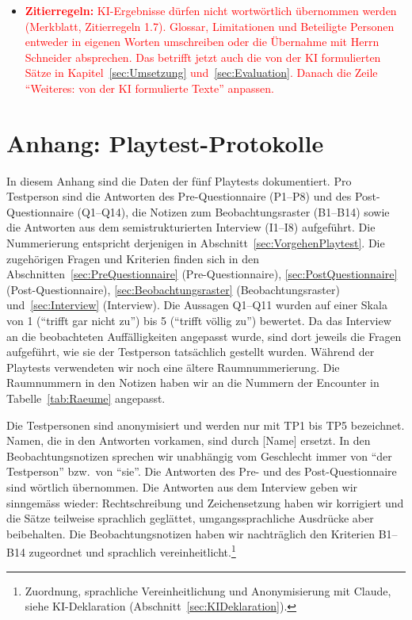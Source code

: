 \documentclass[../Main.tex]{subfiles}
\begin{document}
\begin{itemize}[leftmargin=1.5cm]
    \item \textcolor{red}{\textbf{Zitierregeln:} KI-Ergebnisse dürfen nicht wortwörtlich übernommen werden (Merkblatt, Zitierregeln 1.7). Glossar, Limitationen und Beteiligte Personen entweder in eigenen Worten umschreiben oder die Übernahme mit Herrn Schneider absprechen. Das betrifft jetzt auch die von der KI formulierten Sätze in Kapitel~\ref{sec:Umsetzung} und~\ref{sec:Evaluation}. Danach die Zeile \enquote{Weiteres: von der KI formulierte Texte} anpassen.}
\end{itemize}

\newpage
{}
\section{Anhang: Playtest-Protokolle} \label{sec:PlaytestProtokolle}

In diesem Anhang sind die Daten der fünf Playtests dokumentiert. Pro Testperson sind die Antworten des Pre-Questionnaire (P1--P8) und des Post-Questionnaire (Q1--Q14), die Notizen zum Beobachtungsraster (B1--B14) sowie die Antworten aus dem semistrukturierten Interview (I1--I8) aufgeführt. Die Nummerierung entspricht derjenigen in Abschnitt~\ref{sec:VorgehenPlaytest}. Die zugehörigen Fragen und Kriterien finden sich in den Abschnitten~\ref{sec:PreQuestionnaire} (Pre-Questionnaire), \ref{sec:PostQuestionnaire} (Post-Questionnaire), \ref{sec:Beobachtungsraster} (Beobachtungsraster) und~\ref{sec:Interview} (Interview). Die Aussagen Q1--Q11 wurden auf einer Skala von 1 (\enquote{trifft gar nicht zu}) bis 5 (\enquote{trifft völlig zu}) bewertet. Da das Interview an die beobachteten Auffälligkeiten angepasst wurde, sind dort jeweils die Fragen aufgeführt, wie sie der Testperson tatsächlich gestellt wurden. Während der Playtests verwendeten wir noch eine ältere Raumnummerierung. Die Raumnummern in den Notizen haben wir an die Nummern der Encounter in Tabelle~\ref{tab:Raeume} angepasst.

Die Testpersonen sind anonymisiert und werden nur mit TP1 bis TP5 bezeichnet. Namen, die in den Antworten vorkamen, sind durch [Name] ersetzt. In den Beobachtungsnotizen sprechen wir unabhängig vom Geschlecht immer von \enquote{der Testperson} bzw.\ von \enquote{sie}. Die Antworten des Pre- und des Post-Questionnaire sind wörtlich übernommen. Die Antworten aus dem Interview geben wir sinngemäss wieder: Rechtschreibung und Zeichensetzung haben wir korrigiert und die Sätze teilweise sprachlich geglättet, umgangssprachliche Ausdrücke aber beibehalten. Die Beobachtungsnotizen haben wir nachträglich den Kriterien B1--B14 zugeordnet und sprachlich vereinheitlicht.\footnote{Zuordnung, sprachliche Vereinheitlichung und Anonymisierung mit Claude, siehe KI-Deklaration (Abschnitt~\ref{sec:KIDeklaration}).}
\end{document}
